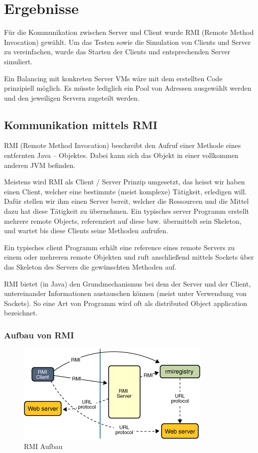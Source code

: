 \section{Ergebnisse}
Für die Kommunikation zwischen Server und Client wurde RMI (Remote Method Invocation) gewählt. Um das Testen sowie die Simulation von Clients und Server zu vereinfachen, wurde das Starten der Clients und entsprechenden Server simuliert.

Ein Balancing mit konkreten Server VMs wäre mit dem erstellten Code prinzipiell möglich. Es müsste lediglich ein Pool von Adressen ausgewählt werden und den jeweiligen Servern zugeteilt werden.

\subsection{Kommunikation mittels RMI}
RMI (Remote Method Invocation) beschreibt den Aufruf einer Methode eines entfernten Java – Objektes. Dabei kann sich das Objekt in einer vollkommen anderen JVM befinden.

Meistens wird RMI als Client / Server Prinzip umgesetzt, das heisst wir haben einen Client, welcher eine bestimmte (meist komplexe) Tätigkeit, erledigen will. Dafür stellen wir ihm einen Server bereit, welcher die Ressourcen und die Mittel dazu hat diese Tätigkeit zu übernehmen.
Ein typisches server Programm erstellt mehrere remote Objects, referenziert auf diese bzw. übermittelt sein Skeleton, und wartet bis diese Clients seine Methoden aufrufen.

Ein typisches client Programm erhält eine reference eines remote Servers zu einem oder mehreren remote Objekten und ruft anschließend mittels Sockets über das Skeleton des Servers die gewünschten Methoden auf.

RMI bietet (in Java) den Grundmechanismus bei dem der Server und der Client, untereinander Informationen austauschen können (meist unter Verwendung von Sockets). So eine Art von Programm wird oft als distributed Object application bezeichnet.

\subsubsection{Aufbau von RMI}

\begin{figure}[!h]
\centering
\includegraphics[width=0.46\linewidth]{images/rmi}
\caption{RMI Aufbau}
\label{fig:rmi}
\end{figure}

